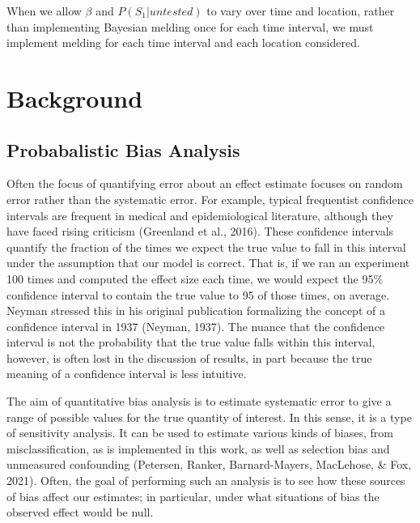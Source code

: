 \documentclass[12pt,twoside]{smiththesis}
\begin{document}
When we allow \(\beta\) and \(P(S_1|untested)\) to vary over time and location, rather than implementing Bayesian melding once for each time interval, we must implement melding for each time interval and each location considered.

\hypertarget{background}{%
\chapter{Background}\label{background}}

\hypertarget{probabalistic-bias-analysis}{%
\section{Probabalistic Bias Analysis}\label{probabalistic-bias-analysis}}

Often the focus of quantifying error about an effect estimate focuses on random error rather than the systematic error. For example, typical frequentist confidence intervals are frequent in medical and epidemiological literature, although they have faced rising criticism (Greenland et al., 2016). These confidence intervals quantify the fraction of the times we expect the true value to fall in this interval under the assumption that our model is correct. That is, if we ran an experiment 100 times and computed the effect size each time, we would expect the 95\% confidence interval to contain the true value to 95 of those times, on average. Neyman stressed this in his original publication formalizing the concept of a confidence interval in 1937 (Neyman, 1937). The nuance that the confidence interval is not the probability that the true value falls within this interval, however, is often lost in the discussion of results, in part because the true meaning of a confidence interval is less intuitive.

The aim of quantitative bias analysis is to estimate systematic error to give a range of possible values for the true quantity of interest. In this sense, it is a type of sensitivity analysis. It can be used to estimate various kinds of biases, from misclassification, as is implemented in this work, as well as selection bias and unmeasured confounding (Petersen, Ranker, Barnard-Mayers, MacLehose, \& Fox, 2021). Often, the goal of performing such an analysis is to see how these sources of bias affect our estimates; in particular, under what situations of bias the observed effect would be null.
\end{document}
